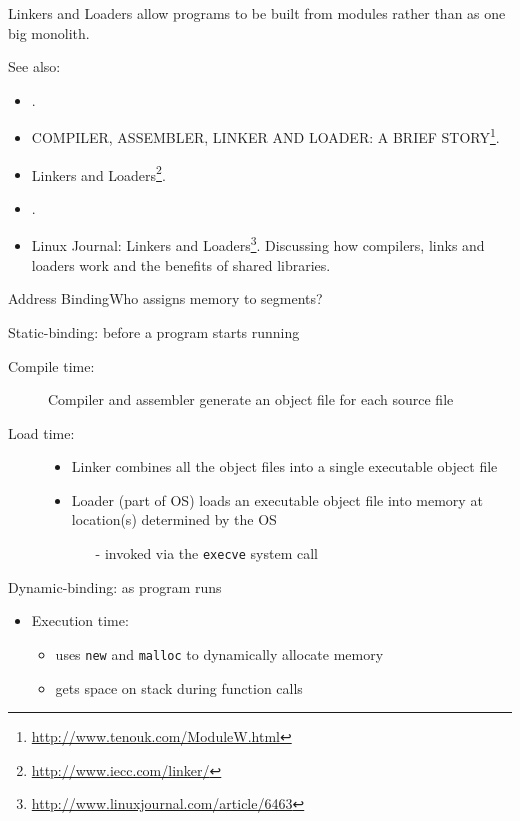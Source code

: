 Linkers and Loaders allow programs to be built from modules rather than as one big
monolith.

See also:
\begin{itemize}
\item {}.
\item COMPILER, ASSEMBLER, LINKER AND LOADER: A BRIEF
  STORY\footnote{\url{http://www.tenouk.com/ModuleW.html}}.
\item Linkers and Loaders\footnote{\url{http://www.iecc.com/linker/}}.
\item {}.
\item Linux Journal: Linkers and
  Loaders\footnote{\url{http://www.linuxjournal.com/article/6463}}. Discussing how
  compilers, links and loaders work and the benefits of shared libraries.
\end{itemize}

\begin{frame}{Address Binding}{Who assigns memory to segments?}
  \begin{block}{Static-binding: before a program starts running}
    \begin{description}
    \item[Compile time:] \alert{Compiler} and \alert{assembler} generate an object file for
      each source file
    \item[Load time:] \hfill
      \begin{itemize}
      \item \alert{Linker} combines all the object files into a single executable object
        file
      \item \alert{Loader} (part of OS) loads an executable object file into
        memory at location(s) determined by the OS
        \begin{itemize}
        \item[-] invoked via the \texttt{execve} system call
        \end{itemize}
      \end{itemize}
    \end{description}
  \end{block}
  \begin{block}{Dynamic-binding: as program runs}
    \begin{itemize}
    \item Execution time:
      \begin{itemize}
      \item uses \texttt{new} and \texttt{malloc} to dynamically allocate memory
      \item gets space on stack during function calls
      \end{itemize}
    \end{itemize}
  \end{block}
\end{frame}

